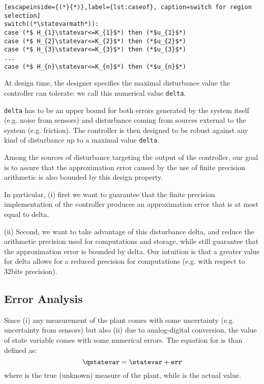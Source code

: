 \begin{lstlisting}[escapeinside={(*}{*)},label={lst:caseof}, caption=switch for region selection]
switch((*\statevarmath*)):
case (*$ H_{1}\statevar<=K_{1}$*) then (*$u_{1}$*)
case (*$ H_{2}\statevar<=K_{2}$*) then (*$u_{2}$*)
case (*$ H_{3}\statevar<=K_{3}$*) then (*$u_{3}$*)
...
case (*$ H_{n}\statevar<=K_{n}$*) then (*$u_{n}$*)
\end{lstlisting}

At design time, the designer specifies the maximal disturbance value the controller can tolerate: we call this numerical value \texttt{delta}. 

\texttt{delta} has to be an upper bound for both errors generated by the system itself (e.g. noise from sensors) and disturbance coming from sources external to the system (e.g. friction). The controller is then designed to be robust against any kind of disturbance up to a maximal value \texttt{delta}.

Among the sources of disturbance targeting the output of the controller, our goal is to assure that the approximation error caused by the use of finite precision arithmetic is also bounded by this design property.

In particular, (i) first we want to guarantee that the finite precision implementation of the controller produces an approximation error that is at most equal to delta.

(ii) Second, we want to take advantage of this disturbance delta, and reduce the arithmetic precision used for computations and storage, while still guarantee that the approximation error is bounded by delta. Our intuition is that a greater value for delta allows for a reduced precision for computations (e.g. with respect to 32bits precision).

\subsection{Error Analysis}
Since (i) any measurement of the plant comes with some uncertainty (e.g. uncertainty from sensors) but also (ii) due to analog-digital conversion, the value of state variable \statevarmath comes with some numerical errors. The equation for \statevarmath is than defined as:
\begin{equation}
\qstatevar=\statevar + \texttt{err}
\end{equation}
where \statevarmath is the true (unknown) measure of the plant, while \qstatevarmath is the actual value.

